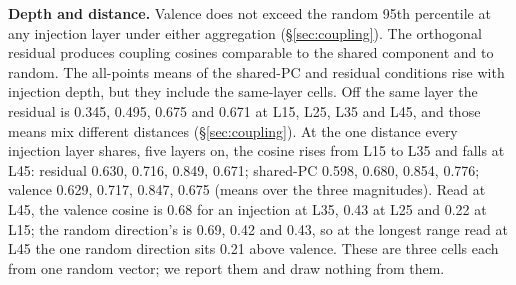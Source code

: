 \documentclass[11pt,a4paper]{article}
\begin{document}
\textbf{Depth and distance.} Valence does not exceed the random 95th percentile at any injection layer under either aggregation (\S\ref{sec:coupling}). The orthogonal residual produces coupling cosines comparable to the shared component and to random. The all-points means of the shared-PC and residual conditions rise with injection depth, but they include the same-layer cells. Off the same layer the residual is 0.345, 0.495, 0.675 and 0.671 at L15, L25, L35 and L45, and those means mix different distances (\S\ref{sec:coupling}). At the one distance every injection layer shares, five layers on, the cosine rises from L15 to L35 and falls at L45: residual 0.630, 0.716, 0.849, 0.671; shared-PC 0.598, 0.680, 0.854, 0.776; valence 0.629, 0.717, 0.847, 0.675 (means over the three magnitudes). Read at L45, the valence cosine is 0.68 for an injection at L35, 0.43 at L25 and 0.22 at L15; the random direction's is 0.69, 0.42 and 0.43, so at the longest range read at L45 the one random direction sits 0.21 above valence. These are three cells each from one random vector; we report them and draw nothing from them.
\end{document}
